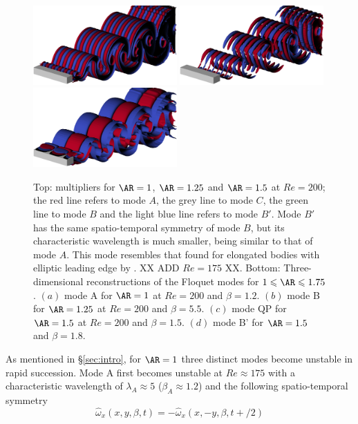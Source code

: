 \begin{figure}
  \includegraphics[width=0.49\textwidth]{./fig/AR1s/Floqetmode_beta_5p5_Re200_AR1p25_B.png}
  \includegraphics[width=0.49\textwidth]{./fig/AR1s/Floqetmode_beta_3p75_Re200_AR1p5_C.png}
  \includegraphics[width=0.49\textwidth]{./fig/AR1s/Floqetmode_beta_1p8_Re200_AR1p5_Bp.png}  
  \caption{Top: multipliers for $\AR=1$, $\AR=1.25$ and $\AR=1.5$ at $Re=200$; the red line refers to mode $A$, the grey line to mode $C$, the green line to mode $B$ and the light blue line refers to mode $B'$. Mode $B'$ has the same spatio-temporal symmetry of mode $B$, but its characteristic wavelength is much smaller, being similar to that of mode $A$. This mode resembles that found for elongated bodies with elliptic leading edge by \cite{ryan-etal-2005}. XX ADD $Re=175$ XX. Bottom: Three-dimensional reconstructions of the Floquet modes for $1 \le \AR \le 1.75$. $(a)$ mode A for $\AR=1$ at $Re=200$ and $\beta=1.2$. $(b)$ mode B for $\AR=1.25$ at $Re=200$ and $\beta=5.5$. $(c)$ mode QP for $\AR=1.5$ at $Re=200$ and $\beta=1.5$. $(d)$ mode B' for $\AR=1.5$ and $\beta=1.8$.}
  \label{fig:mult_AR1_AR1p75}
\end{figure}
%
As mentioned in \S\ref{sec:intro}, for $\AR=1$ three distinct modes become unstable in rapid succession. Mode A first becomes unstable at $Re \approx 175$ with a characteristic wavelength of $\lambda_A \approx 5$ ($\beta_A \approx 1.2$) and the following spatio-temporal symmetry 
%
\begin{equation}
  \hat{\omega}_x(x,y,\beta,t) = - \hat{\omega}_x(x,-y,\beta,t+/2)
\end{equation}

